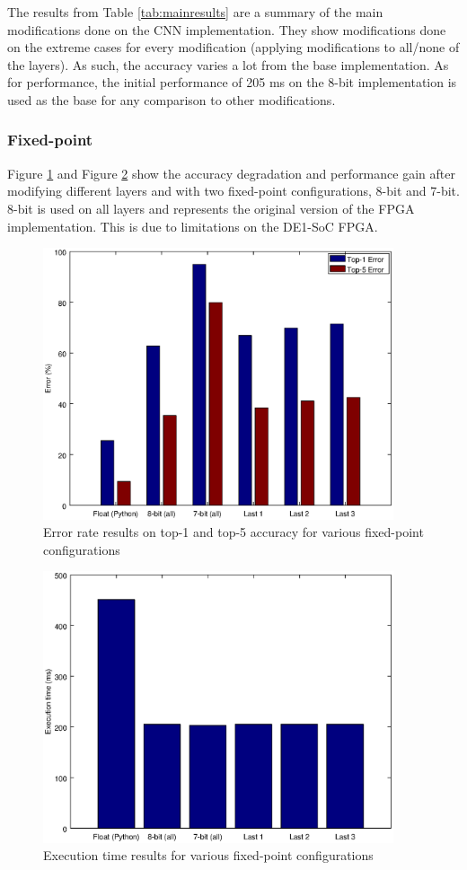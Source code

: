\begin{enumerate}
The results from Table \ref{tab:mainresults} are a summary of the main modifications done
on the CNN implementation. They show modifications done on the extreme cases for every
modification (applying modifications to all/none of the layers). As such, the accuracy
varies a lot from the base implementation. As for performance, the initial performance of
205 ms on the 8-bit implementation is used as the base for any comparison to other
modifications.

\subsubsection{Fixed-point}

Figure \ref{fig:fpaccuracy} and Figure \ref{fig:fpperformance} show the accuracy degradation 
and performance gain after
modifying different layers and with two fixed-point configurations, 8-bit and 7-bit.
8-bit is used on all layers and represents the original version of the FPGA implementation.
This is due to limitations on the DE1-SoC FPGA.

\begin{figure}[H]
    \centering
    \includegraphics[height=8cm]{fig/fpaccuracy.eps}
    \caption{Error rate results on top-1 and top-5 accuracy for various fixed-point configurations}
    \label{fig:fpaccuracy}
\end{figure}

\begin{figure}[H]
    \centering
    \includegraphics[height=8cm]{fig/fpperformance.eps}
    \caption{Execution time results for various fixed-point configurations}
    \label{fig:fpperformance}
\end{figure}


\end{enumerate}
